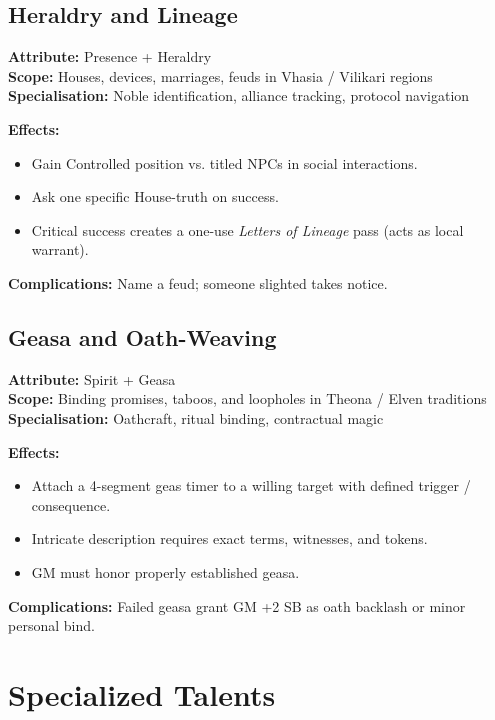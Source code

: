 \subsection{Heraldry and Lineage}\label{subsec:heraldry}

\textbf{Attribute:} Presence + Heraldry\\
\textbf{Scope:} Houses, devices, marriages, feuds in Vhasia / Vilikari regions\\
\textbf{Specialisation:} Noble identification, alliance tracking, protocol navigation

\textbf{Effects:}
\begin{itemize}
    \item Gain Controlled position vs. titled NPCs in social interactions.
    \item Ask one specific House-truth on success.
    \item Critical success creates a one-use \emph{Letters of Lineage} pass (acts as local warrant).
\end{itemize}
\textbf{Complications:} Name a feud; someone slighted takes notice.

\subsection{Geasa and Oath-Weaving}\label{subsec:geasa}

\textbf{Attribute:} Spirit + Geasa\\
\textbf{Scope:} Binding promises, taboos, and loopholes in Theona / Elven traditions\\
\textbf{Specialisation:} Oathcraft, ritual binding, contractual magic

\textbf{Effects:}
\begin{itemize}
    \item Attach a 4-segment geas timer to a willing target with defined trigger / consequence.
    \item Intricate description requires exact terms, witnesses, and tokens.
    \item GM must honor properly established geasa.
\end{itemize}
\textbf{Complications:} Failed geasa grant GM +2 SB as oath backlash or minor personal bind.

\section{Specialized Talents}\label{sec:specialised_talents}

